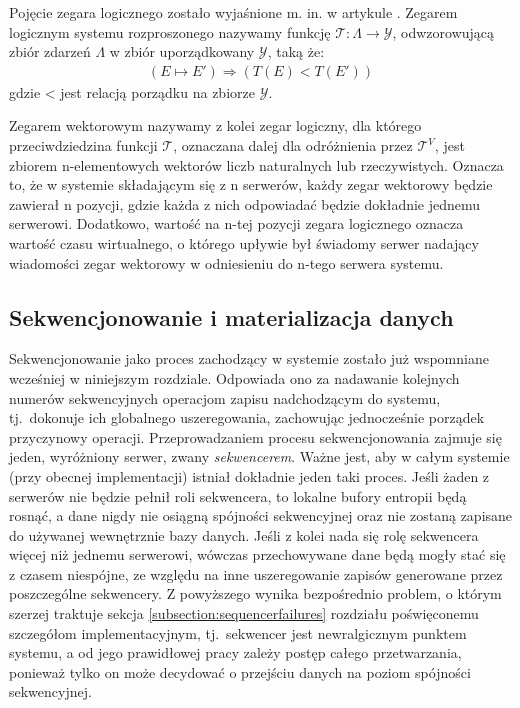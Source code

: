 Pojęcie zegara logicznego zostało wyjaśnione m. in. w artykule \cite{Lamport:1978:TCO:359545.359563}. Zegarem logicznym systemu rozproszonego nazywamy funkcję $ \mathcal{T}: \Lambda \rightarrow \mathcal{Y} $, odwzorowującą zbiór zdarzeń $ \Lambda $ w zbiór uporządkowany $ \mathcal{Y} $, taką że:
\begin{align*}
    (E \mapsto E') \Rightarrow (T(E) < T(E'))    
\end{align*}
gdzie < jest relacją porządku na zbiorze $ \mathcal{Y} $.

Zegarem wektorowym nazywamy z kolei zegar logiczny, dla którego przeciwdziedzina funkcji $ \mathcal{T} $, oznaczana dalej dla odróżnienia przez $ \mathcal{T}^V $, jest zbiorem n-elementowych wektorów liczb naturalnych lub rzeczywistych. Oznacza to, że w systemie składającym się z n serwerów, każdy zegar wektorowy będzie zawierał n pozycji, gdzie każda z nich odpowiadać będzie dokładnie jednemu serwerowi. Dodatkowo, wartość na n-tej pozycji zegara logicznego oznacza wartość czasu wirtualnego, o którego upływie był świadomy serwer nadający wiadomości zegar wektorowy w odniesieniu do n-tego serwera systemu.

\subsection{Sekwencjonowanie i materializacja danych} \label{section:materialization}


Sekwencjonowanie jako proces zachodzący w systemie zostało już wspomniane wcześniej w niniejszym
rozdziale. Odpowiada ono za nadawanie kolejnych numerów sekwencyjnych operacjom zapisu nadchodzącym
do systemu, tj.\ dokonuje ich globalnego uszeregowania, zachowując jednocześnie porządek przyczynowy
operacji. Przeprowadzaniem procesu sekwencjonowania zajmuje się jeden, wyróżniony serwer, zwany
\textit{sekwencerem}. Ważne jest, aby w całym systemie (przy obecnej implementacji) istniał
dokładnie jeden taki proces. Jeśli żaden z serwerów nie będzie pełnił roli sekwencera, to lokalne
bufory entropii będą rosnąć, a dane nigdy nie osiągną spójności sekwencyjnej oraz nie zostaną
zapisane do używanej wewnętrznie bazy danych. Jeśli z kolei nada się rolę sekwencera więcej niż
jednemu serwerowi, wówczas przechowywane dane będą mogły stać się z czasem niespójne, ze względu na
inne uszeregowanie zapisów generowane przez poszczególne sekwencery. Z powyższego wynika
bezpośrednio problem, o którym szerzej traktuje sekcja \ref{subsection:sequencerfailures} rozdziału
poświęconemu szczegółom implementacyjnym, tj.\ sekwencer jest newralgicznym punktem systemu, a od jego prawidłowej pracy zależy postęp całego przetwarzania, ponieważ tylko on może decydować o przejściu danych na poziom spójności sekwencyjnej.

